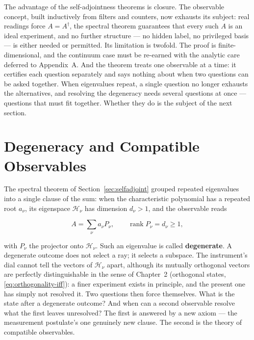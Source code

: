 The advantage of the self-adjointness theorems is closure. The observable concept, built inductively from filters and counters, now exhausts its subject: real readings force $A=A^\dagger$, the spectral theorem guarantees that every such $A$ is an ideal experiment, and no further structure --- no hidden label, no privileged basis --- is either needed or permitted. Its limitation is twofold. The proof is finite-dimensional, and the continuum case must be re-earned with the analytic care deferred to Appendix~A. And the theorem treats one observable at a time: it certifies each question separately and says nothing about when two questions can be asked together. When eigenvalues repeat, a single question no longer exhausts the alternatives, and resolving the degeneracy needs several questions at once --- questions that must fit together. Whether they do is the subject of the next section.

\section{Degeneracy and Compatible Observables}
\label{sec:compatible}

The spectral theorem of Section~\ref{sec:selfadjoint} grouped repeated eigenvalues into a single clause of the sum: when the characteristic polynomial has a repeated root $a_\nu$, its eigenspace $\mathcal H_\nu$ has dimension $d_\nu>1$, and the observable reads
\begin{linenomath}
\begin{equation}
    A=\sum_\nu a_\nu P_\nu,
    \qquad
    \operatorname{rank}P_\nu=d_\nu\geq1 ,
    \label{eq:spectral-degenerate}
\end{equation}
\end{linenomath}
with $P_\nu$ the projector onto $\mathcal H_\nu$. Such an eigenvalue is called \textbf{degenerate}. A degenerate outcome does not select a ray; it selects a subspace. The instrument's dial cannot tell the vectors of $\mathcal H_\nu$ apart, although its mutually orthogonal vectors are perfectly distinguishable in the sense of Chapter~2 (orthogonal states, \eqref{eq:orthogonality-iff}): a finer experiment exists in principle, and the present one has simply not resolved it. Two questions then force themselves. What is the state after a degenerate outcome? And when can a second observable resolve what the first leaves unresolved? The first is answered by a new axiom --- the measurement postulate's one genuinely new clause. The second is the theory of compatible observables.

